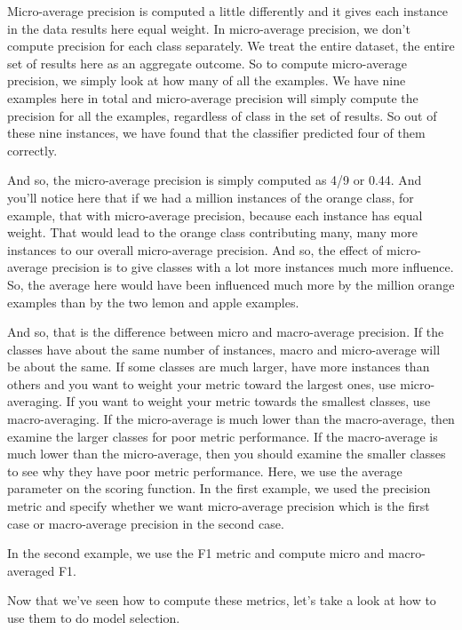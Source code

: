 \begin{multicols}{2}
Micro-average precision is computed a little differently and it gives each instance in the data results here equal weight. In micro-average precision, we don't compute precision for each class separately. We treat the entire dataset, the entire set of results here as an aggregate outcome. So to compute micro-average precision, we simply look at how many of all the examples. We have nine examples here in total and micro-average precision will simply compute the precision for all the examples, regardless of class in the set of results. So out of these nine instances, we have found that the classifier predicted four of them correctly. 

And so, the micro-average precision is simply computed as 4/9 or 0.44. And you'll notice here that if we had a million instances of the orange class, for example, that with micro-average precision, because each instance has equal weight. That would lead to the orange class contributing many, many more instances to our overall micro-average precision. And so, the effect of micro-average precision is to give classes with a lot more instances much more influence. So, the average here would have been influenced much more by the million orange examples than by the two lemon and apple examples. 

And so, that is the difference between micro and macro-average precision. If the classes have about the same number of instances, macro and micro-average will be about the same. If some classes are much larger, have more instances than others and you want to weight your metric toward the largest ones, use micro-averaging. If you want to weight your metric towards the smallest classes, use macro-averaging. If the micro-average is much lower than the macro-average, then examine the larger classes for poor metric performance. If the macro-average is much lower than the micro-average, then you should examine the smaller classes to see why they have poor metric performance. Here, we use the average parameter on the scoring function. In the first example, we used the precision metric and specify whether we want micro-average precision which is the first case or macro-average precision in the second case. 

In the second example, we use the F1 metric and compute micro and macro-averaged F1. 

Now that we've seen how to compute these metrics, let's take a look at how to use them to do model selection. 

\end{multicols}
